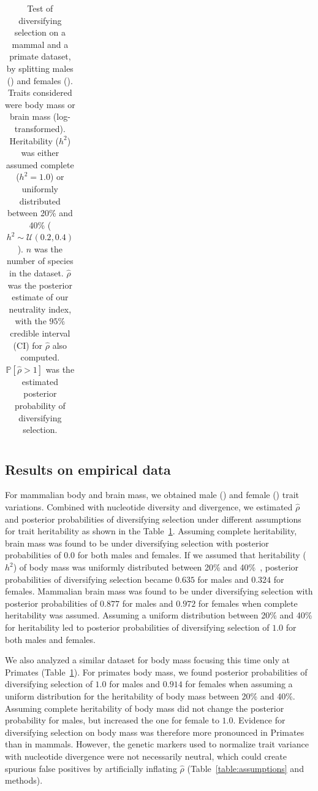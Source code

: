 \documentclass{article}
\newcommand{\proba}{\mathbb{P}}
\newcommand{\NbrTaxa}{n}
\newcommand{\Heritability}{h^2}
\newcommand{\EstNI}{\widehat{\rho}}
\begin{document}
\begin{table}[t!]
\begin{adjustbox}{width = 0.75\textwidth}
\begin{tabular}{||l|l|l|c|c|c|c|c||}
        \bottomrule
        \end{tabular}
    \end{adjustbox}
    \caption{
    Test of diversifying selection on a mammal and a primate dataset, by splitting males (\Male) and females (\Female).
    Traits considered were body mass or brain mass (log-transformed).
    Heritability ($\Heritability$) was either assumed complete ($\Heritability=1.0$) or uniformly distributed between 20\% and 40\%  ($\Heritability \sim \mathcal{U}(0.2, 0.4)$).
    $\NbrTaxa$ was the number of species in the dataset.
    $\EstNI$ was the posterior estimate of our neutrality index, with the $95\%$ credible interval (CI) for $\EstNI$ also computed.
    $\proba [\EstNI > 1 ]$ was the estimated posterior probability of diversifying selection.
    }
    \label{table:empirical}
\end{table}

\subsection*{Results on empirical data}\label{subsec:results-on-empirical-data}

For mammalian body and brain mass, we obtained male (\Male) and female (\Female) trait variations.
Combined with nucleotide diversity and divergence, we estimated $\EstNI$ and posterior probabilities of diversifying selection under different assumptions for trait heritability as shown in the Table~\ref{table:empirical}.
Assuming complete heritability, brain mass was found to be under diversifying selection with posterior probabilities of $0.0$ for both males and females.
If we assumed that heritability ($\Heritability$) of body mass was uniformly distributed between 20\% and 40\%~\citep{hu_bringing_2022}, posterior probabilities of diversifying selection became $0.635$ for males and $0.324$ for females.
Mammalian brain mass was found to be under diversifying selection with posterior probabilities of $0.877$ for males and $0.972$ for females when complete heritability was assumed.
Assuming a uniform distribution between 20\% and 40\% for heritability led to posterior probabilities of diversifying selection of $1.0$ for both males and females.

We also analyzed a similar dataset for body mass focusing this time only at Primates (Table~\ref{table:empirical}).
For primates body mass, we found posterior probabilities of diversifying selection of $1.0$ for males and $0.914$ for females when assuming a uniform distribution for the heritability of body mass between 20\% and 40\%.
Assuming complete heritability of body mass did not change the posterior probability for males, but increased the one for female to $1.0$.
Evidence for diversifying selection on body mass was therefore more pronounced in Primates than in mammals.
However, the genetic markers used to normalize trait variance with nucleotide divergence were not necessarily neutral, which could create spurious false positives by artificially inflating $\EstNI$ (Table~\ref{table:assumptions} and methods).
\end{document}
